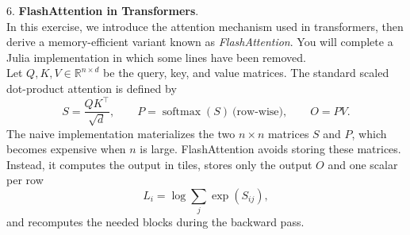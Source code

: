 \documentclass{article}
\theoremstyle{definition}
\theoremstyle{remark}
\begin{document}
6. \textbf{FlashAttention in Transformers}. \vspace{0.2cm}\\
In this exercise, we introduce the attention mechanism used in transformers, then derive a memory-efficient variant known as \emph{FlashAttention}. You will complete a Julia implementation in which some lines have been removed. \\
Let $Q,K,V \in \mathbb{R}^{n \times d}$ be the query, key, and value matrices. The standard scaled dot-product attention is defined by
\[
S = \frac{QK^\top}{\sqrt{d}}, \qquad
P = \operatorname{softmax}(S) \ \text{(row-wise)}, \qquad
O = PV.
\]
The naive implementation materializes the two $n \times n$ matrices $S$ and $P$, which becomes expensive when $n$ is large. FlashAttention avoids storing these matrices. Instead, it computes the output in tiles, stores only the output $O$ and one scalar per row
\[
L_i = \log\!\sum_j \exp(S_{ij}),
\]
and recomputes the needed blocks during the backward pass.
\end{document}
